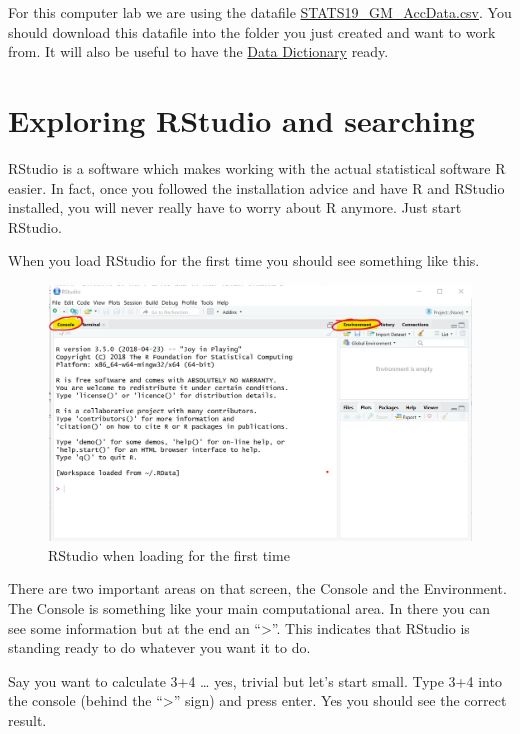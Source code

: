 \documentclass[
]{article}
\begin{document}
For this computer lab we are using the datafile
\href{https://datasquad.github.io/ECLR/Data/STATS19_GM_AccData.csv}{STATS19\_GM\_AccData.csv}.
You should download this datafile into the folder you just created and
want to work from. It will also be useful to have the
\href{https://assets.publishing.service.gov.uk/government/uploads/system/uploads/attachment_data/file/995422/stats19.pdf}{Data
Dictionary} ready.

\hypertarget{exploring-rstudio-and-searching}{%
\section{Exploring RStudio and
searching}\label{exploring-rstudio-and-searching}}

RStudio is a software which makes working with the actual statistical
software R easier. In fact, once you followed the installation advice
and have R and RStudio installed, you will never really have to worry
about R anymore. Just start RStudio.

When you load RStudio for the first time you should see something like
this.

\begin{figure}
\centering
\includegraphics{images/RStudio_image0.png}
\caption{RStudio when loading for the first time}
\end{figure}

There are two important areas on that screen, the Console and the
Environment. The Console is something like your main computational area.
In there you can see some information but at the end an
``\textgreater{}''. This indicates that RStudio is standing ready to do
whatever you want it to do.

Say you want to calculate 3+4 \ldots{} yes, trivial but let's start
small. Type 3+4 into the console (behind the ``\textgreater{}'' sign)
and press enter. Yes you should see the correct result.
\end{document}
